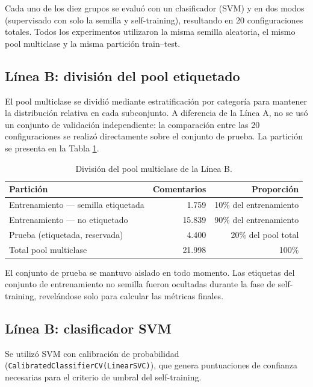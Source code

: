 \documentclass[12pt,a4paper]{article}
\newcommand{\code}[1]{\nolinkurl{#1}}
\begin{document}
Cada uno de los diez grupos se evaluó con un clasificador (SVM) y en dos modos (supervisado con solo la semilla y self-training), resultando en 20 configuraciones totales. Todos los experimentos utilizaron la misma semilla aleatoria, el mismo pool multiclase y la misma partición train--test.

\subsection{Línea B: división del pool etiquetado}

El pool multiclase se dividió mediante estratificación por categoría para mantener la distribución relativa en cada subconjunto. A diferencia de la Línea A, no se usó un conjunto de validación independiente: la comparación entre las 20 configuraciones se realizó directamente sobre el conjunto de prueba. La partición se presenta en la Tabla \ref{tab:particion_b}.

\begin{table}[htbp]
\centering
\caption{División del pool multiclase de la Línea B.}
\label{tab:particion_b}
\small
\begin{tabular}{lrr}
\toprule
\textbf{Partición} & \textbf{Comentarios} & \textbf{Proporción} \\
\midrule
Entrenamiento — semilla etiquetada & 1.759 & 10\% del entrenamiento \\
Entrenamiento — no etiquetado     & 15.839 & 90\% del entrenamiento \\
Prueba (etiquetada, reservada)    & 4.400 & 20\% del pool total \\
\midrule
Total pool multiclase & 21.998 & 100\% \\
\bottomrule
\end{tabular}
\end{table}
\FloatBarrier

El conjunto de prueba se mantuvo aislado en todo momento. Las etiquetas del conjunto de entrenamiento no semilla fueron ocultadas durante la fase de self-training, revelándose solo para calcular las métricas finales.

\subsection{Línea B: clasificador SVM}

Se utilizó SVM con calibración de probabilidad (\code{CalibratedClassifierCV(LinearSVC)}), que genera puntuaciones de confianza necesarias para el criterio de umbral del self-training.
\end{document}

